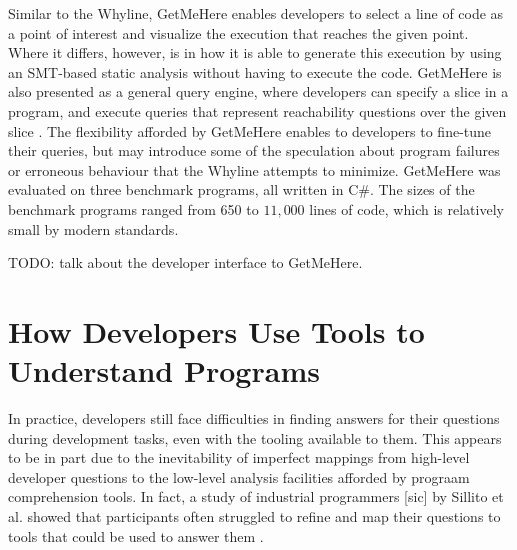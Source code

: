 \par Similar to the Whyline, GetMeHere enables developers to select a line of 
code as a point of interest and visualize the execution that reaches the given 
point.
Where it differs, however, is in how it is able to generate this execution
by using an SMT-based static analysis \cite{barnett-2014-get} without having to
execute the code.
GetMeHere is also presented as a general query engine, where developers can
specify a slice in a program, and execute queries that represent reachability
questions over the given slice \cite{barnett-2014-get}.
The flexibility afforded by GetMeHere enables to developers to fine-tune their
queries, but may introduce some of the speculation about program failures or
erroneous behaviour that the Whyline attempts to minimize.
GetMeHere was evaluated on three benchmark programs, all written in C\#.
The sizes of the benchmark programs ranged from 650 to $11,000$ lines of code,
which is relatively small by modern standards.

\par TODO: talk about the developer interface to GetMeHere.

\section{How Developers Use Tools to Understand Programs}
\label{sec:HowDevelopersUseToolsToUnderstandPrograms}

\noindent In practice, developers still face difficulties in finding answers 
for their questions during development tasks, even with the tooling available 
to them.
This appears to be in part due to the inevitability of imperfect mappings from
high-level developer questions to the low-level analysis facilities afforded
by prograam comprehension tools.
In fact, a study of industrial programmers [sic] by Sillito et al. showed that 
participants often struggled to refine and map their questions to tools
that could be used to answer them \cite{sillito-2006-questions-during-task}.

